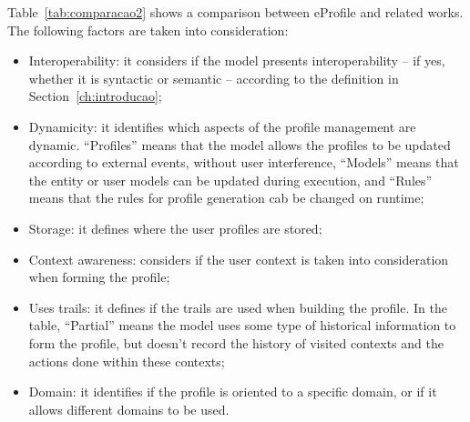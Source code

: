 \documentclass{svjour3}                     %
\begin{document}
Table~\ref{tab:comparacao2} shows a comparison between eProfile and related works. The following factors are taken into consideration:

\begin{itemize}
  \item Interoperability: it considers if the model presents interoperability -- if yes, whether it is syntactic or semantic -- according to the definition in Section~\ref{ch:introducao};
  \item Dynamicity: it identifies which aspects of the profile management are dynamic. ``Profiles'' means that the model allows the profiles to be updated according to external events, without user interference, ``Models'' means that the entity or user models can be updated during execution, and ``Rules'' means that the rules for profile generation cab be changed on runtime;
  \item Storage: it defines where the user profiles are stored;
  \item Context awareness: considers if the user context is taken into consideration when forming the profile;
  \item Uses trails: it defines if the trails are used when building the profile. In the table, ``Partial'' means the model uses some type of historical information to form the profile, but doesn't record the history of visited contexts and the actions done within these contexts;
  \item Domain: it identifies if the profile is oriented to a specific domain, or if it allows different domains to be used.
\end{itemize}
\end{document}
